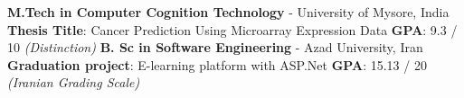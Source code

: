 %
%
%

\vspace{1em}

\begin{scholarship}

	{
		\textbf{M.Tech in Computer Cognition Technology} - University of Mysore, India \newline
		\textbf{Thesis Title}: Cancer Prediction Using Microarray Expression Data \newline
		\textbf{GPA}: 9.3 / 10 \textit{(Distinction) }\newline
	}
	{
		\textbf{B. Sc in Software Engineering} - Azad University, Iran \newline
		\textbf{Graduation project}: E-learning platform with ASP.Net \newline
		\textbf{GPA}: 15.13 / 20 \textit{(Iranian Grading Scale)}  \newline
	}
\end{scholarship}